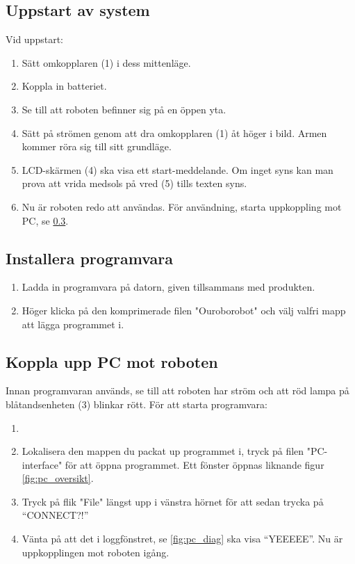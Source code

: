 \documentclass[a4paper,12pt]{article}
\begin{document}
\subsection{Uppstart av system}
Vid uppstart:
\begin{enumerate}
    \item Sätt omkopplaren (1) i dess mittenläge.
    \item Koppla in batteriet.
    \item Se till att roboten befinner sig på en öppen yta.
    \item Sätt på strömen genom att dra omkopplaren (1) åt höger i bild. Armen kommer röra sig till sitt grundläge.
    \item LCD-skärmen (4) ska visa ett start-meddelande. Om inget syns kan man prova att vrida medsols på vred (5) tills texten syns.
    \item  Nu är roboten redo att användas. För användning, starta uppkoppling mot PC, se \ref{subsec:start_pc}.
\end{enumerate}

\subsection{Installera programvara}
\label{subsec:install_pc}
\begin{enumerate}
    \item Ladda in programvara på datorn, given tillsammans med produkten.
    \item Höger klicka på den komprimerade filen "Ouroborobot" och välj valfri mapp att lägga programmet i.
\end{enumerate}


\subsection{Koppla upp PC mot roboten}
\label{subsec:start_pc}
Innan programvaran används, se till att roboten har ström och att röd lampa på blåtandsenheten (3) blinkar rött. För att starta programvara:
\begin{enumerate}
    \item \item Lokalisera den mappen du packat up programmet i, tryck på filen "PC-interface" för att öppna programmet.  Ett fönster öppnas liknande figur \ref{fig:pc_oversikt}. 
    \item Tryck på flik "File"  längst upp i vänstra hörnet för att sedan trycka på “CONNECT?!”
    \item Vänta på att det i loggfönstret, se \ref{fig:pc_diag}  ska visa “YEEEEE”. Nu är uppkopplingen mot roboten igång. 
\end{enumerate}
\end{document}
